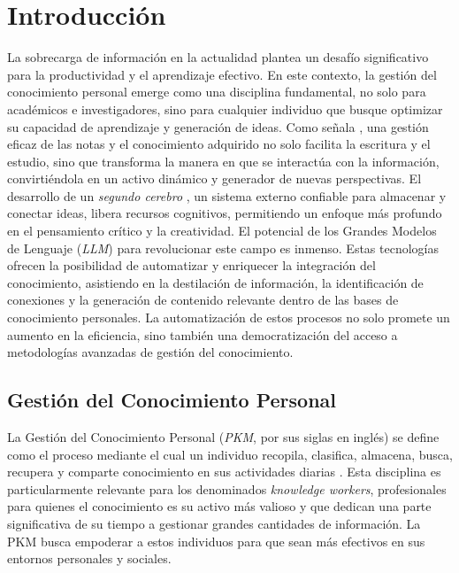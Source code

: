 \chapter{Introducción}
\label{chapter:introduccion}

La sobrecarga de información en la actualidad plantea un desafío significativo para la productividad y el aprendizaje efectivo. En este contexto, la gestión del conocimiento personal emerge como una disciplina fundamental, no solo para académicos e investigadores, sino para cualquier individuo que busque optimizar su capacidad de aprendizaje y generación de ideas. Como señala \cite{ahrensHowTakeSmart2017}, una gestión eficaz de las notas y el conocimiento adquirido no solo facilita la escritura y el estudio, sino que transforma la manera en que se interactúa con la información, convirtiéndola en un activo dinámico y generador de nuevas perspectivas. El desarrollo de un \textit{segundo cerebro} \parencite{forteBuildingSecondBrain2022}, un sistema externo confiable para almacenar y conectar ideas, libera recursos cognitivos, permitiendo un enfoque más profundo en el pensamiento crítico y la creatividad.
El potencial de los Grandes Modelos de Lenguaje (\textit{LLM}) para revolucionar este campo es inmenso. Estas tecnologías ofrecen la posibilidad de automatizar y enriquecer la integración del conocimiento, asistiendo en la destilación de información, la identificación de conexiones y la generación de contenido relevante dentro de las bases de conocimiento personales. La automatización de estos procesos no solo promete un aumento en la eficiencia, sino también una democratización del acceso a metodologías avanzadas de gestión del conocimiento.

\section{Gestión del Conocimiento Personal}
\label{sec:pkm}
La Gestión del Conocimiento Personal (\textit{PKM}, por sus siglas en inglés) se define como el proceso mediante el cual un individuo recopila, clasifica, almacena, busca, recupera y comparte conocimiento en sus actividades diarias \parencite{grundspenkisAgentBasedApproach2007}. Esta disciplina es particularmente relevante para los denominados \textit{knowledge workers}, profesionales para quienes el conocimiento es su activo más valioso y que dedican una parte significativa de su tiempo a gestionar grandes cantidades de información. La PKM busca empoderar a estos individuos para que sean más efectivos en sus entornos personales y sociales.


